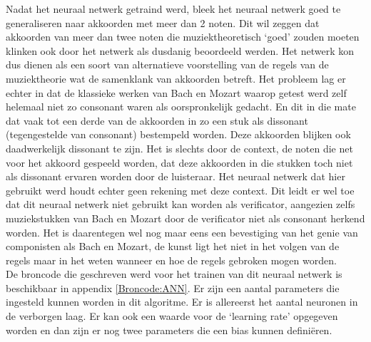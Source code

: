Nadat het neuraal netwerk getraind werd, bleek het neuraal netwerk goed te generaliseren naar akkoorden met meer dan 2 noten. Dit wil zeggen dat akkoorden van meer dan twee noten die muziektheoretisch `goed' zouden moeten klinken ook door het netwerk als dusdanig beoordeeld werden. Het netwerk kon dus dienen als een soort van alternatieve voorstelling van de regels van de muziektheorie wat de samenklank van akkoorden betreft. Het probleem lag er echter in dat de klassieke werken van Bach \cite{url:bach} en Mozart \cite{url:mozart} waarop getest werd zelf helemaal niet zo consonant waren als oorspronkelijk gedacht. En dit in die mate dat vaak tot een derde van de akkoorden in zo een stuk als dissonant (tegengestelde van consonant) bestempeld worden. Deze akkoorden blijken ook daadwerkelijk dissonant te zijn. Het is slechts door de context, de noten die net voor het akkoord gespeeld worden, dat deze akkoorden in die stukken toch niet als dissonant ervaren worden door de luisteraar. Het neuraal netwerk dat hier gebruikt werd houdt echter geen rekening met deze context. Dit leidt er wel toe dat dit neuraal netwerk niet gebruikt kan worden als verificator, aangezien zelfs muziekstukken van Bach en Mozart door de verificator niet als consonant herkend worden. Het is daarentegen wel nog maar eens een bevestiging van het genie van componisten als Bach en Mozart, de kunst ligt het niet in het volgen van de regels maar in het weten wanneer en hoe de regels gebroken mogen worden.\\
De broncode die geschreven werd voor het trainen van dit neuraal netwerk is beschikbaar in appendix \ref{Broncode:ANN}. Er zijn een aantal parameters die ingesteld kunnen worden in dit algoritme. Er is allereerst het aantal neuronen in de verborgen laag. Er kan ook een waarde voor de `learning rate' opgegeven worden en dan zijn er nog twee parameters die een bias kunnen defini\"eren.

